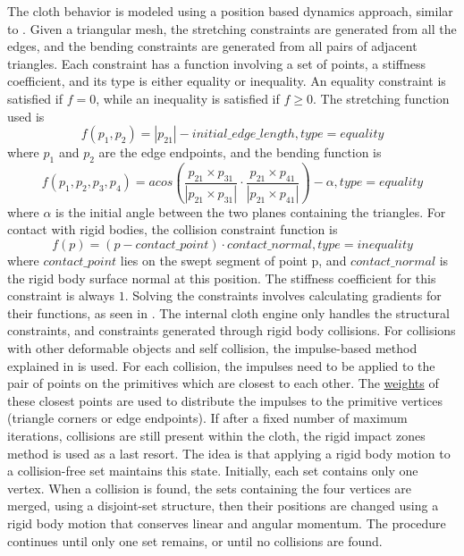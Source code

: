 The cloth behavior is modeled using a position based dynamics approach, similar to \citep{mullerpbd}. Given a triangular mesh, the stretching constraints are generated from all the edges, and the bending constraints are generated from all pairs of adjacent triangles. Each constraint has a function involving a set of points, a stiffness coefficient, and its type is either equality or inequality. An equality constraint is satisfied if $f = 0$, while an inequality is satisfied if $f \geq 0$. The stretching function used is \[f(p_{1}, p_{2}) = | p_{21} | - initial\_edge\_length, type = equality\] where $p_{1}$ and $p_{2}$ are the edge endpoints, and the bending function is \[ f(p_{1}, p_{2}, p_{3}, p_{4}) = acos(\frac{p_{21} \times p_{31}}{|p_{21} \times p_{31}|} \cdot \frac{p_{21} \times p_{41}}{|p_{21} \times p_{41}|}) - \alpha, type = equality\] where $\alpha$ is the initial angle between the two planes containing the triangles. For contact with rigid bodies, the collision constraint function is \[f(p) = (p - contact\_point) \cdot contact\_normal, type = inequality\] where $contact\_point$ lies on the swept segment of point p, and $contact\_normal$ is the rigid body surface normal at this position. The stiffness coefficient for this constraint is always $1$. Solving the constraints involves calculating gradients for their functions, as seen in \citep{mullerpbd}. The internal cloth engine only handles the structural constraints, and constraints generated through rigid body collisions. For collisions with other deformable objects and self collision, the impulse-based method explained in \citep{bridson02} is used. For each collision, the impulses need to be applied to the pair of points on the primitives which are closest to each other. The \hyperref[bary]{weights} of these closest points are used to distribute the impulses to the primitive vertices (triangle corners or edge endpoints). If after a fixed number of maximum iterations, collisions are still present within the cloth, the rigid impact zones method \citep{bridson02} is used as a last resort. The idea is that applying a rigid body motion to a collision-free set maintains this state. Initially, each set contains only one vertex. When a collision is found, the sets containing the four vertices are merged, using a disjoint-set structure, then their positions are changed using a rigid body motion that conserves linear and angular momentum. The procedure continues until only one set remains, or until no collisions are found.


